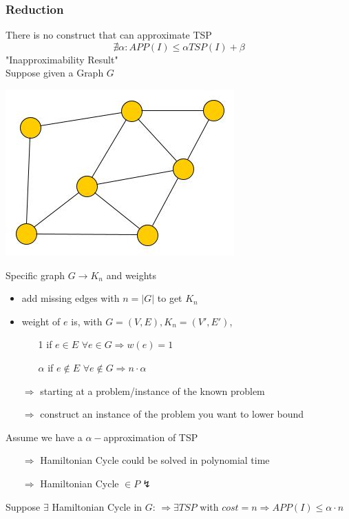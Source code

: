 \subsubsection{Reduction}
There is no construct that can approximate TSP 
$$\nexists \alpha : APP(I) \leq \alpha TSP(I) + \beta$$
"Inapproximability Result" \\
Suppose given a Graph $G$
\begin{center}
	\includegraphics[scale=0.5]{img/graph30}
\end{center}
Specific graph $G \rightarrow K_n$ and weights
\begin{itemize}
	\item add missing edges with $n = |G|$ to get $K_n$
	\item weight of $e$ is, with $G = (V,E), K_n= (V',E')$,
		\begin{itemize}
			\item[1] if $e \in E$ $\forall e \in G \Rightarrow w(e) = 1$
			\item[$\alpha$] if $e \notin E$ $\forall e \notin G \Rightarrow n \cdot \alpha$
		\end{itemize}
	\item[$\Rightarrow$] starting at a problem/instance of the known problem 
	\item[$\Rightarrow$] construct an instance of the problem you want to lower bound
\end{itemize}
Assume we have a $\alpha-$approximation of TSP
\begin{itemize}
	\item[$\Rightarrow$] Hamiltonian Cycle could be solved in polynomial time
	\item[$\Rightarrow$] Hamiltonian Cycle $\in P \lightning$
\end{itemize}
Suppose $\exists$ Hamiltonian Cycle in $G$: $\Rightarrow \exists TSP$ with $cost = n \Rightarrow APP(I) \leq \alpha \cdot n$ \\
